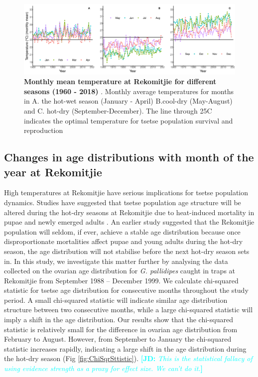 \documentclass[12pt,a4paper]{article}
\newcommand{\comment}[3]{\textcolor{#1}{\textbf{[#2: }\textsl{#3}\textbf{]}}}
\newcommand{\jd}[1]{\comment{cyan}{JD}{#1}}
\begin{document}
\begin{figure}[hbt!]
	\centering
	\includegraphics[width=1.1\linewidth]{21April20CombineTemPlot}
	\caption{{\bf Monthly mean temperature at Rekomitjie for different seasons (1960 - 2018) }. Monthly average temperatures for months in A. the hot-wet season (January - April)  B.cool-dry (May-August) and C. hot-dry (September-December). The line through 25\degree C indicates the optimal temperature for tsetse population survival and reproduction}
	\label{fig:combineTem}
\end{figure}


\newpage
\subsection*{Changes in age distributions with month of the year at Rekomitjie}
High temperatures at Rekomitjie have serious implications for tsetse population dynamics. Studies have suggested that tsetse population age structure will be altered during the hot-dry seasons at Rekomitjie due to heat-induced mortality in pupae and newly emerged adults \cite{Hargrove2013b,hargrove2015mortality,Ackley2017}. An earlier study \cite{VanSickle1988} suggested that the Rekomitjie population will seldom, if ever, achieve a stable age distribution because once disproportionate mortalities affect pupae and young adults during the hot-dry season, the age distribution will not stabilise before the next hot-dry season sets in. In this study, we investigate this matter further by analysing the data collected on the ovarian age distribution for \textit{G. pallidipes} caught in traps at Rekomitjie from September 1988 – December 1999. We calculate chi-squared statistic for tsetse age distribution for consecutive months throughout the study period. A small chi-squared statistic will indicate similar age distribution structure between two consecutive months, while a large chi-squared statistic will imply a shift in the age distribution.  Our results show that the chi-squared statistic   is relatively small for the difference in ovarian age distribution from February to August. However, from September to January the chi-squared statistic increases rapidly, indicating a large shift in the age distribution during the hot-dry season (Fig \ref{fig:ChiSqrSttistic}). \jd{This is the statistical fallacy of using evidence strength as a proxy for effect size. We can't do it.}
\end{document}
